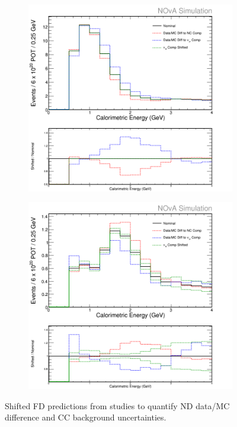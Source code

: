 \begin{figure}[h]
  \centering
  \begin{subfigure}{.48\textwidth}
    \centering
    \includegraphics[width=1\linewidth]{figures/cNCEXDecompSysts.png}
  \end{subfigure}
  \begin{subfigure}{.48\textwidth}
    \centering
    \includegraphics[width=1\linewidth]{figures/cBGEXDecompSysts.png}
  \end{subfigure}
  \caption[Systematic Error Due to ND Data/MC Discrepancy and CC Background Uncertainty]{Shifted FD predictions from studies to quantify ND data/MC difference and CC background uncertainties.}
  \label{fig:SystNDDataMC}
\end{figure}

